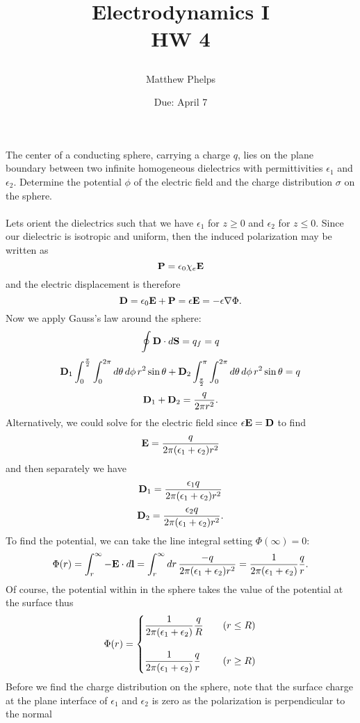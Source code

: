\documentclass[11pt,letterpaper]{article}
\title{\begin{spacing}{1.2}Electrodynamics I\\HW 4\end{spacing}}
\author{Matthew Phelps}
\date{Due: April 7}
\begin{document}
\maketitle

\benum

	\item
	The center of a conducting sphere, carrying a charge $q$, lies on the plane boundary between two infinite homogeneous dielectrics with
	permittivities $\epsilon_1$ and $\epsilon_2$. Determine the potential $\phi$ of the electric field and the charge distribution $\sigma$ on 
	the sphere. 
	\\
	\\
	Lets orient the dielectrics such that we have $\epsilon_1$ for $z\ge 0$ and $\epsilon_2$ for $z\le 0$. Since our dielectric is isotropic and 
	uniform, then the induced polarization may be written as
	\[
		\mathbf{P}  = \epsilon_0 \chi_e \mathbf{E}
	\]
	and the electric displacement is therefore
	\[
		\mathbf{D} = \epsilon_0 \mathbf{E}+\mathbf{P} = \epsilon \mathbf{E}=-\epsilon\nabla \Phi.
	\]
	Now we apply Gauss's law around the sphere:
	\[
		\oint \mathbf{D}\cdot d\mathbf{S} = q_f = q
	\]
	\[
		 \mathbf{D}_1 \int_0^{\frac{\pi}{2}}\int_0^{2\pi} d\theta\,  d\phi\, r^2\sin\theta+\mathbf{D}_2 \int_{\frac{\pi}{2}}^\pi \int_0^{2\pi} 
		d\theta\,  d\phi\, r^2\sin\theta = q
	\]
	\[
		\mathbf{D}_1 +\mathbf{D}_2 = \frac{q}{2\pi r^2}.
	\]
	Alternatively, we could solve for the electric field since $\epsilon \mathbf{E} = \mathbf{D}$ to find
	\[
		\mathbf{E} = \frac{q}{2\pi(\epsilon_1+\epsilon_2)r^2}
	\]
	and then separately we have
	\[
		\mathbf{D}_1 = \frac{\epsilon_1 q}{2\pi(\epsilon_1+\epsilon_2)r^2}
	\]
	\[
		\mathbf{D}_2 = \frac{\epsilon_2 q}{2\pi(\epsilon_1+\epsilon_2)r^2}.
	\]
	To find the potential, we can take the line integral setting $\Phi(\infty) = 0$:
	\[
		\Phi(r) = \int _r^\infty -\mathbf{E}\cdot d\mathbf{l}  = \int_r^\infty dr \, \frac{-q}{2\pi(\epsilon_1+\epsilon_2)r^2} =  
		\frac{1}{2\pi(\epsilon_1+\epsilon_2)}\frac{q}{r}.
	\]
	Of course, the potential within in the sphere takes the value of the potential at the surface thus
	\[
		\Phi(r) = \begin{cases}\displaystyle \frac{1}{2\pi(\epsilon_1+\epsilon_2)}\frac{q}{R}&\quad(r\le R)\\ \\
		\displaystyle \frac{1}{2\pi(\epsilon_1+\epsilon_2)}\frac{q}{r}&\quad (r \ge R)
		\end{cases}
	\]
	Before we find the charge distribution on the sphere, note that the surface charge at the plane interface of $\epsilon_1$ and $\epsilon_2$ 	is zero as the polarization is perpendicular to the normal
\end{document}
